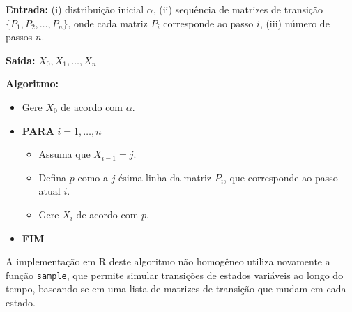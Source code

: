 \documentclass[12pt]{article}
\theoremstyle{break}
\begin{document}
\textbf{Entrada:} (i) distribuição inicial \( \alpha \), (ii) sequência de matrizes de transição \( \{ P_1, P_2, \dots, P_n \} \), onde cada matriz \( P_i \) corresponde ao passo \( i \), (iii) número de passos \( n \).

\textbf{Saída:} \( X_0, X_1, \dots, X_n \)

\textbf{Algoritmo:}
\begin{itemize}
    \item Gere \( X_0 \) de acordo com \( \alpha \).
    \item \textbf{PARA} \( i = 1, \dots, n \)
    \begin{itemize}
        \item Assuma que \( X_{i-1} = j \).
        \item Defina \( p \) como a \( j \)-ésima linha da matriz \( P_i \), que corresponde ao passo atual \( i \).
        \item Gere \( X_i \) de acordo com \( p \).
    \end{itemize}
    \item \textbf{FIM}
\end{itemize}

A implementação em R deste algoritmo não homogêneo utiliza novamente a função \texttt{sample}, que permite simular transições de estados variáveis ao longo do tempo, baseando-se em uma lista de matrizes de transição que mudam em cada estado. 
\end{document}
